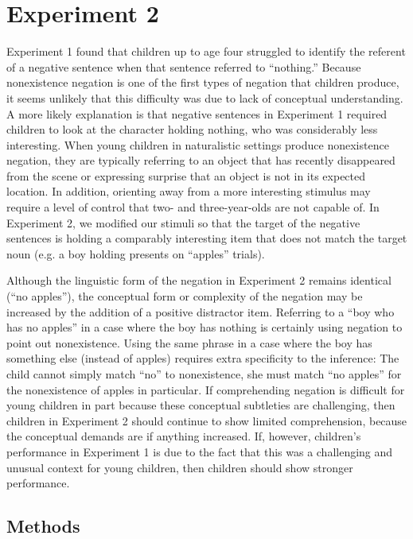 \documentclass[man]{apa2}
\begin{document}
\section{Experiment 2}

Experiment 1 found that children up to age four struggled to identify the referent of a negative sentence when that sentence referred to ``nothing.''  Because nonexistence negation is one of the first types of negation that children produce, it seems unlikely that this difficulty was due to lack of conceptual understanding.  A more likely explanation is that negative sentences in Experiment 1 required children to look at the character holding nothing, who was considerably less interesting.  When young children in naturalistic settings produce nonexistence negation, they are typically referring to an object that has recently disappeared from the scene or expressing surprise that an object is not in its expected location.  In addition, orienting away from a more interesting stimulus may require a level of control that two- and three-year-olds are not capable of.  In Experiment 2, we modified our stimuli so that the target of the negative sentences is holding a comparably interesting item that does not match the target noun (e.g. a boy holding presents on ``apples'' trials).  

Although the linguistic form of the negation in Experiment 2 remains identical (``no apples''), the conceptual form or complexity of the negation may be increased by the addition of a positive distractor item. Referring to a ``boy who has no apples'' in a case where the boy has nothing is certainly using negation to point out nonexistence. Using the same phrase in a case where the boy has something else (instead of apples) requires extra specificity to the inference: The child cannot simply match ``no'' to nonexistence, she must match ``no apples'' for the nonexistence of apples in particular. If comprehending negation is difficult for young children in part because these conceptual subtleties are challenging, then children in Experiment 2 should continue to show limited comprehension, because the conceptual demands are if anything increased.  If, however, children's performance in Experiment 1 is due to the fact that this was a challenging and unusual context for young children, then children should show stronger performance.  

\subsection{Methods}
\end{document}
